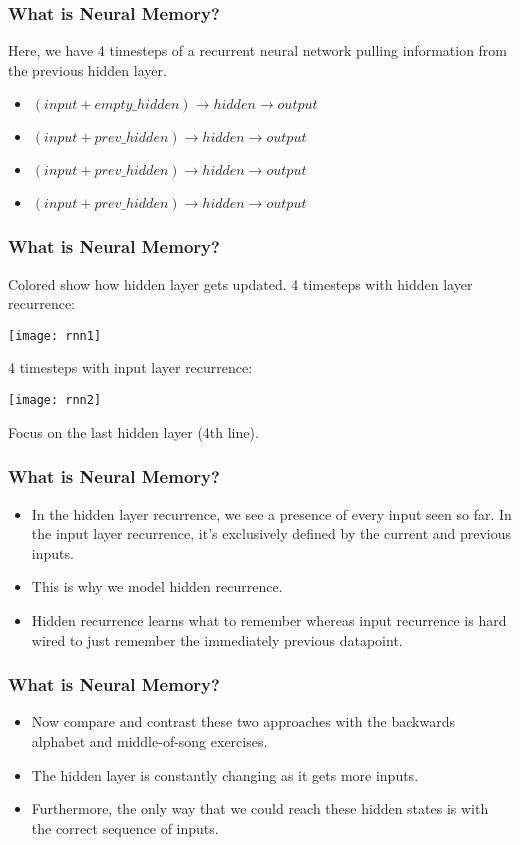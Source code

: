 \begin{frame}[fragile] \frametitle{What is Neural Memory?}
Here, we have 4 timesteps of a recurrent neural network pulling information from the previous hidden layer.
\begin{itemize}
\item $(input + empty\_hidden) \rightarrow hidden \rightarrow output$
\item $(input + prev\_hidden) \rightarrow hidden \rightarrow output$
\item $(input + prev\_hidden) \rightarrow hidden \rightarrow output$
\item $(input + prev\_hidden) \rightarrow hidden \rightarrow output$
\end{itemize}
\end{frame}

\begin{frame}[fragile] \frametitle{What is Neural Memory?}
Colored show how hidden layer gets updated. 
4 timesteps with hidden layer recurrence:
\begin{center}
\texttt{[image: rnn1]}
\end{center}
4 timesteps with input  layer recurrence:
\begin{center}
\texttt{[image: rnn2]}
\end{center}
Focus on the last hidden layer (4th line).
\end{frame}

\begin{frame}[fragile] \frametitle{What is Neural Memory?}
\begin{itemize}
\item  In the hidden layer recurrence, we see a presence of every input seen so far. In the input layer recurrence, it's exclusively defined by the current and previous inputs. 
\item This is why we model hidden recurrence.
\item Hidden recurrence learns what to remember whereas input recurrence is hard wired to just remember the immediately previous datapoint. 
\end{itemize}
\end{frame}

\begin{frame}[fragile] \frametitle{What is Neural Memory?}
\begin{itemize}
\item  Now compare and contrast these two approaches with the backwards alphabet and middle-of-song exercises. 
\item The hidden layer is constantly changing as it gets more inputs. 
\item Furthermore, the only way that we could reach these hidden states is with the correct sequence of inputs.
\end{itemize}
\end{frame}



